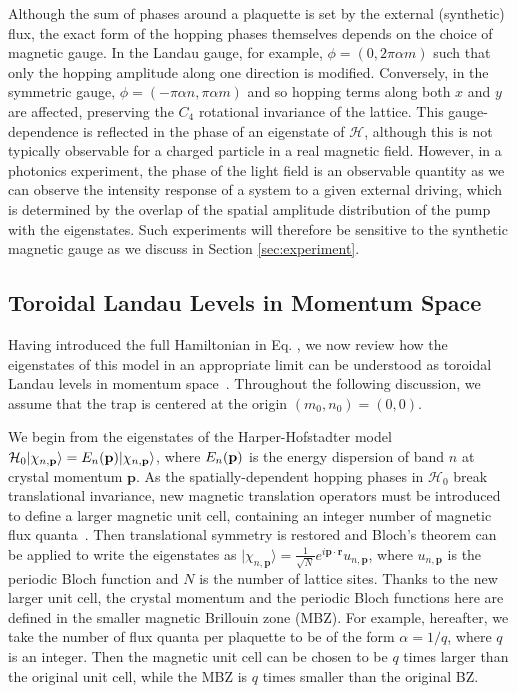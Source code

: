 \documentclass[twocolumn, 10pt, aps, superscriptaddress, floatfix, showpacs, pra, citeautoscript]{revtex4-1}
\newcommand{\vt}[1]{\mathbf{#1}}
\newcommand{\ket}[1]{|#1\rangle}
\begin{document}
Although the sum of phases around a plaquette is set by the external (synthetic) flux, the exact form of the hopping phases themselves depends on the choice of magnetic gauge. In the Landau gauge, for example, $\phi = (0, 2\pi\alpha m)$ such that only the hopping amplitude along one direction is modified. Conversely, in the symmetric gauge, $\phi = (-\pi\alpha n, \pi\alpha m)$ and so hopping terms along both $x$ and $y$ are affected, preserving the $C_4$ rotational invariance of the lattice. This gauge-dependence is reflected in the phase of an eigenstate of $\mathcal{H}$, although this is not typically observable for a charged particle in a real magnetic field. However, in a photonics experiment, the phase of the light field is an observable quantity as we can observe the intensity response of a system to a given external driving, which is determined by the overlap of the spatial amplitude distribution of the pump with the eigenstates. Such experiments will therefore be sensitive to the synthetic magnetic gauge as we discuss in Section \ref{sec:experiment}.

\subsection{Toroidal Landau Levels in Momentum Space}\label{sec:eigenstates}

Having introduced the full Hamiltonian  in Eq. , we now review how the eigenstates of this model in an appropriate limit can be understood as toroidal Landau levels in momentum space~\cite{price2014magnetic}. Throughout the following discussion, we assume that the trap is centered at the origin $(m_0, n_0)= (0,0)$.  

We begin from the eigenstates of the Harper-Hofstadter model $\mathcal{H}_0\ket{\chi_{n,\vt{p}}} = E_n ({\bf p}) \ket{\chi_{n,\vt{p}}}$, where $E_n ({\bf p}) $ is the energy dispersion of band $n$ at crystal momentum $\vt{p}$. As the spatially-dependent hopping phases in $\mathcal{H}_0$ break translational invariance, new magnetic translation operators must be introduced to define a larger magnetic unit cell, containing an integer number of magnetic flux quanta~\cite{zak1964group, zak1964representations, 1chang}. Then translational symmetry is restored and Bloch's theorem can be applied to write the eigenstates as $\ket{\chi_{n,\vt{p}}} = \frac{1}{\sqrt{N}} e^{i\vt{p}\cdot \vt{r}} u_{n,\vt{p}}$, where $u_{n,\vt{p}}$ is the periodic Bloch function and $N$ is the number of lattice sites. Thanks to the new larger unit cell, the crystal momentum and the periodic Bloch functions here are defined in the smaller magnetic Brillouin zone (MBZ). For example, hereafter, we take the number of flux quanta per plaquette to be of the form $\alpha=1/q$, where $q$ is an integer. Then the magnetic unit cell can be chosen to be $q$ times larger than the original unit cell, while the MBZ is $q$ times smaller than the original BZ.
\end{document}
